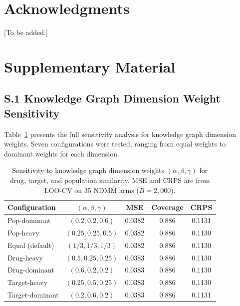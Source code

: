 \documentclass[12pt]{article}
\begin{document}
\section*{Acknowledgments}

[To be added.]




\clearpage
\appendix
\setcounter{table}{0}
\renewcommand{\thetable}{S\arabic{table}}
\setcounter{figure}{0}
\renewcommand{\thefigure}{S\arabic{figure}}

\section*{Supplementary Material}

\subsection*{S.1 Knowledge Graph Dimension Weight Sensitivity}

Table~\ref{tab:supp_kg_weights} presents the full sensitivity analysis for knowledge graph dimension weights. Seven configurations were tested, ranging from equal weights to dominant weights for each dimension.

\begin{table}[ht]
\centering
\caption{Sensitivity to knowledge graph dimension weights $(\alpha, \beta, \gamma)$ for drug, target, and population similarity. MSE and CRPS are from LOO-CV on 35 NDMM arms ($B = 2{,}000$).}
\label{tab:supp_kg_weights}
\begin{tabular}{lcccc}
\toprule
Configuration & $(\alpha, \beta, \gamma)$ & MSE & Coverage & CRPS \\
\midrule
Pop-dominant & $(0.2, 0.2, 0.6)$ & 0.0382 & 0.886 & 0.1131 \\
Pop-heavy & $(0.25, 0.25, 0.5)$ & 0.0382 & 0.886 & 0.1130 \\
Equal (default) & $(1/3, 1/3, 1/3)$ & 0.0382 & 0.886 & 0.1130 \\
Drug-heavy & $(0.5, 0.25, 0.25)$ & 0.0383 & 0.886 & 0.1130 \\
Drug-dominant & $(0.6, 0.2, 0.2)$ & 0.0383 & 0.886 & 0.1130 \\
Target-heavy & $(0.25, 0.5, 0.25)$ & 0.0383 & 0.886 & 0.1130 \\
Target-dominant & $(0.2, 0.6, 0.2)$ & 0.0383 & 0.886 & 0.1131 \\
\bottomrule
\end{tabular}
\end{table}
\end{document}

